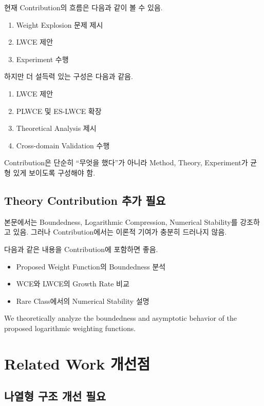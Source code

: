 \documentclass[11pt,a4paper]{article}
\begin{document}
현재 Contribution의 흐름은 다음과 같이 볼 수 있음.

\begin{enumerate}
\item Weight Explosion 문제 제시
\item LWCE 제안
\item Experiment 수행
\end{enumerate}

하지만 더 설득력 있는 구성은 다음과 같음.

\begin{enumerate}
\item LWCE 제안
\item PLWCE 및 ES-LWCE 확장
\item Theoretical Analysis 제시
\item Cross-domain Validation 수행
\end{enumerate}

Contribution은 단순히 ``무엇을 했다''가 아니라 Method, Theory, Experiment가 균형 있게 보이도록 구성해야 함.

\subsection{Theory Contribution 추가 필요}

본문에서는 Boundedness, Logarithmic Compression, Numerical Stability를 강조하고 있음. 그러나 Contribution에서는 이론적 기여가 충분히 드러나지 않음.

다음과 같은 내용을 Contribution에 포함하면 좋음.

\begin{itemize}
\item Proposed Weight Function의 Boundedness 분석
\item WCE와 LWCE의 Growth Rate 비교
\item Rare Class에서의 Numerical Stability 설명
\end{itemize}

\begin{tcolorbox}[title=추가 가능 문장 예시]
We theoretically analyze the boundedness and asymptotic behavior of the proposed logarithmic weighting functions.
\end{tcolorbox}

\section{Related Work 개선점}

\subsection{나열형 구조 개선 필요}
\end{document}
